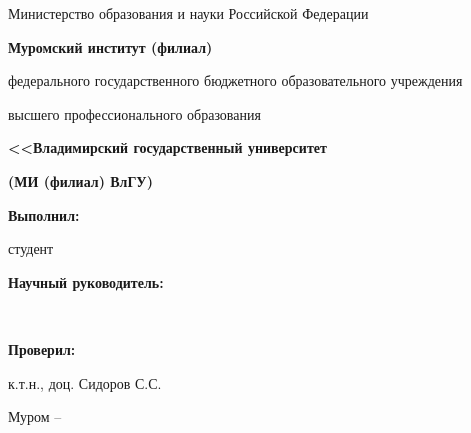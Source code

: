 \newlength{\frontpagefk} %
\setlength{\frontpagefk}{6cm}
\newlength{\frontpagerb} %
\setlength{\frontpagerb}{6cm}
\newlength{\frontpagerbspace} %
\setlength{\frontpagerbspace}{1cm}
\newlength{\FrontPageSubjSpace} %
\setlength{\FrontPageSubjSpace}{1cm}
\newlength{\FrontPageTopicSpace} %
\setlength{\FrontPageTopicSpace}{0.0cm}

\thispagestyle{empty}


\begin{center}
\baselineskip=12pt
{\normalsize Министерство образования и науки Российской Федерации}

\textbf{Муромский институт (филиал)}

{\small федерального государственного бюджетного образовательного учреждения}

{\small высшего профессионального образования}

\textbf{<<Владимирский государственный университет}

\textbf{}

{\normalsize \textbf{(МИ (филиал) ВлГУ)}}
\end{center}

\vspace{\fill}

\begin{center}
{\fontsize{2cm}{1em}\textsl{\WorkType}}
\end{center}

\bigskip

\parbox{15cm}{}

\bigskip

\parbox{15cm}{}

\vspace{\fill}

\bigskip
\bigskip

\begin{flushright}
\parbox{0.4\textwidth}{
\textbf{Выполнил:}

студент
\Author

\textbf{Научный руководитель:}

\ProfessorDegree\ 
\Professor

\textbf{Проверил:}

к.т.н., доц.
Сидоров С.С.
}
\end{flushright}


\vspace{\fill}

\begin{center}
Муром -- \the\year
\end{center}
